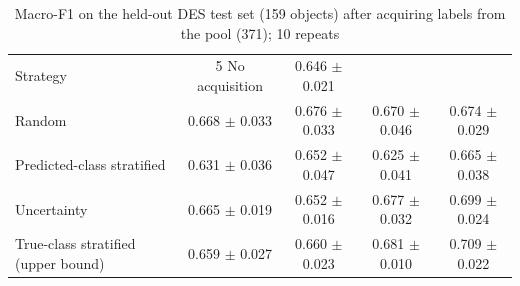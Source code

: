 \begin{table}
\centering
\caption{Macro-F1 on the held-out DES test set (159 objects) after acquiring labels from the pool (371); 10 repeats}
\begin{tabular}{lcccc}
\hline
Strategy & 5%
\hline
No acquisition & 0.646 $\pm$ 0.021 &  &  &  \\
Random & 0.668 $\pm$ 0.033 & 0.676 $\pm$ 0.033 & 0.670 $\pm$ 0.046 & 0.674 $\pm$ 0.029 \\
Predicted-class stratified & 0.631 $\pm$ 0.036 & 0.652 $\pm$ 0.047 & 0.625 $\pm$ 0.041 & 0.665 $\pm$ 0.038 \\
Uncertainty & 0.665 $\pm$ 0.019 & 0.652 $\pm$ 0.016 & 0.677 $\pm$ 0.032 & 0.699 $\pm$ 0.024 \\
True-class stratified (upper bound) & 0.659 $\pm$ 0.027 & 0.660 $\pm$ 0.023 & 0.681 $\pm$ 0.010 & 0.709 $\pm$ 0.022 \\
\hline
\end{tabular}
\end{table}
